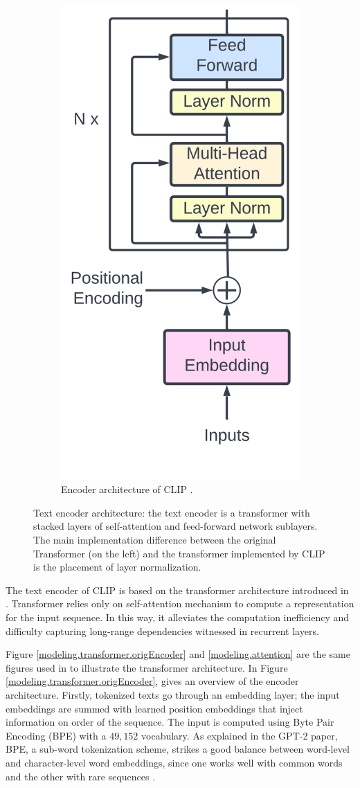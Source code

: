 \begin{figure}[!htb]
\begin{subfigure}{0.5\textwidth}
    \includegraphics[width=0.5\linewidth]{modeling/clip_text_transformer.png}   
    \caption{Encoder architecture of CLIP \citep{CLIPpaper}.}
    \label{modeling.attention.clipEncoder}
\end{subfigure}
\caption{Text encoder architecture: the text encoder is a transformer with stacked layers of self-attention and feed-forward network sublayers. The main implementation difference between the original Transformer (on the left) and the transformer implemented by CLIP is the placement of layer normalization.}
\label{modeling.transformer}
\end{figure}

The text encoder of CLIP is based on the transformer architecture introduced in \citet{attentionAllYouNeed}. Transformer relies only on self-attention mechanism to compute a representation for the input sequence. In this way, it alleviates the computation inefficiency and difficulty capturing long-range dependencies witnessed in recurrent layers.  

Figure \ref{modeling.transformer.origEncoder} and \ref{modeling.attention} are the same figures used in \cite{attentionAllYouNeed} to illustrate the transformer architecture. In Figure \ref{modeling.transformer.origEncoder}, \cite{attentionAllYouNeed} gives an overview of the encoder architecture. Firstly, tokenized texts go through an embedding layer; the input embeddings are summed with learned position embeddings that inject information on order of the sequence. 
The input is computed using Byte Pair Encoding (BPE) with a $49,152$ vocabulary. As explained in the GPT-2 paper, BPE, a sub-word tokenization scheme, strikes a good balance between word-level and character-level word embeddings, since one works well with common words and the other with rare sequences \citep{Radford2019LanguageMA}.

